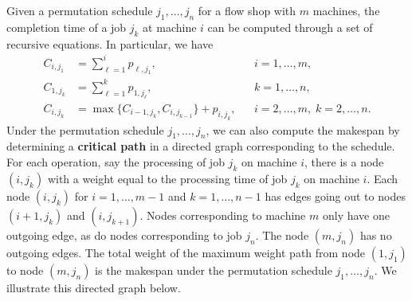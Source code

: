 Given a permutation schedule $j_1, \dots, j_n$ for a flow shop with $m$ 
machines, the completion time of a job $j_k$ at machine $i$ can be 
computed through a set of recursive equations. In particular, we have 
\begin{align*}
    C_{i,j_1} &= \sum_{\ell=1}^i p_{\ell,j_1}, && i = 1, \dots, m, \\ 
    C_{1,j_k} &= \sum_{\ell=1}^k p_{1,j_\ell}, && k = 1, \dots, n, \\ 
    C_{i,j_k} &= \max\{C_{i-1,j_k}, C_{i,j_{k-1}}\} + p_{i,j_k}, && i = 2, \dots, m,\; k = 2, \dots, n.
\end{align*}
Under the permutation schedule $j_1, \dots, j_n$, we can also compute the 
makespan by determining a {\bf critical path} in a directed graph corresponding 
to the schedule. For each operation, say the processing of job $j_k$ 
on machine $i$, there is a node $(i, j_k)$ with a weight equal to the 
processing time of job $j_k$ on machine $i$. Each node $(i, j_k)$ 
for $i = 1, \dots, m-1$ and $k = 1, \dots, n-1$ has edges going out to 
nodes $(i+1, j_k)$ and $(i, j_{k+1})$. Nodes corresponding to machine $m$ 
only have one outgoing edge, as do nodes corresponding to job $j_n$.
The node $(m, j_n)$ has no outgoing edges. The total weight of the 
maximum weight path from node $(1, j_1)$ to node $(m, j_n)$ is the 
makespan under the permutation schedule $j_1, \dots, j_n$. 
We illustrate this directed graph below. 

\begin{center}
\end{center}


